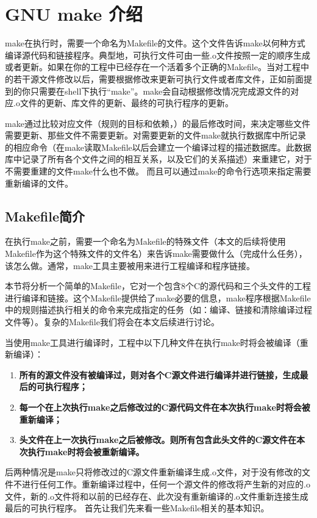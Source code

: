 ﻿\chapter{GNU make 介绍}

make在执行时，需要一个命名为Makefile的文件。这个文件告诉make以何种方式编译源代码和链接程序。典型地，可执行文件可由一些.o文件按照一定的顺序生成或者更新。如果在你的工程中已经存在一个活着多个正确的Makefile。当对工程中的若干源文件修改以后，需要根据修改来更新可执行文件或者库文件，正如前面提到的你只需要在shell下执行“make”。make会自动根据修改情况完成源文件的对应.o文件的更新、库文件的更新、最终的可执行程序的更新。

make通过比较对应文件（规则的目标和依赖，）的最后修改时间，来决定哪些文件需要更新、那些文件不需要更新。对需要更新的文件make就执行数据库中所记录的相应命令（在make读取Makefile以后会建立一个编译过程的描述数据库。此数据库中记录了所有各个文件之间的相互关系，以及它们的关系描述）来重建它，对于不需要重建的文件make什么也不做。
而且可以通过make的命令行选项来指定需要重新编译的文件。


\section{Makefile简介}
在执行make之前，需要一个命名为Makefile的特殊文件（本文的后续将使用Makefile作为这个特殊文件的文件名）来告诉make需要做什么（完成什么任务），该怎么做。通常，make工具主要被用来进行工程编译和程序链接。

本节将分析一个简单的Makefile，它对一个包含8个C的源代码和三个头文件的工程进行编译和链接。这个Makefile提供给了make必要的信息，make程序根据Makefile中的规则描述执行相关的命令来完成指定的任务（如：编译、链接和清除编译过程文件等）。复杂的Makefile我们将会在本文后续进行讨论。

当使用make工具进行编译时，工程中以下几种文件在执行make时将会被编译（重新编译）：
\begin{enumerate}
\itemsep=0pt \parskip=0pt
  \item \textbf{所有的源文件没有被编译过，则对各个C源文件进行编译并进行链接，生成最后的可执行程序；}
  \item \textbf{每一个在上次执行make之后修改过的C源代码文件在本次执行make时将会被重新编译；}
  \item \textbf{头文件在上一次执行make之后被修改。则所有包含此头文件的C源文件在本次执行make时将会被重新编译。}
\end{enumerate}

后两种情况是make只将修改过的C源文件重新编译生成.o文件，对于没有修改的文件不进行任何工作。重新编译过程中，任何一个源文件的修改将产生新的对应的.o文件，新的.o文件将和以前的已经存在、此次没有重新编译的.o文件重新连接生成最后的可执行程序。
首先让我们先来看一些Makefile相关的基本知识。


